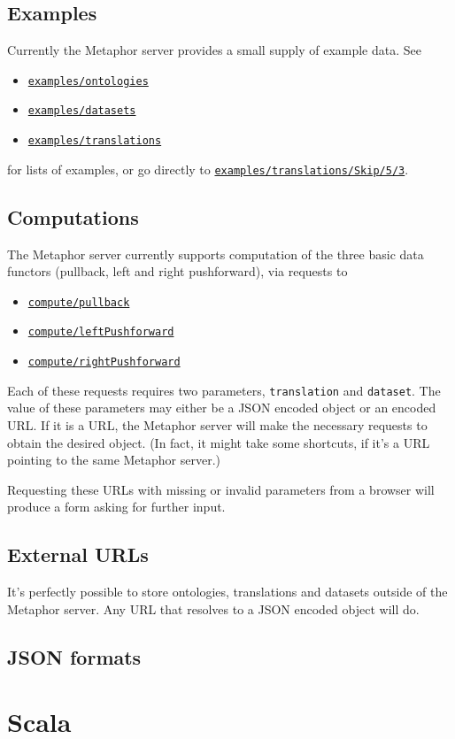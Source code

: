 \documentclass{amsart}
\newcommand{\code}[1]{{\tt #1}}
\newcommand{\metaphor}[1]{\href{http://categoricaldata.net/metaphor/#1}{\tt #1}}
\begin{document}
\subsection{Examples}
Currently the Metaphor server provides a small supply of example data. See
\begin{itemize}
\item \metaphor{examples/ontologies}
\item \metaphor{examples/datasets}
\item \metaphor{examples/translations}
\end{itemize}
for lists of examples, or go directly to \metaphor{examples/translations/Skip/5/3}.

\subsection{Computations}
The Metaphor server currently supports computation of the three basic data functors (pullback, left and right pushforward), via requests to
\begin{itemize}
\item \metaphor{compute/pullback}
\item \metaphor{compute/leftPushforward}
\item \metaphor{compute/rightPushforward}
\end{itemize}
Each of these requests requires two parameters, \code{translation} and \code{dataset}. The value of these parameters may either be a JSON encoded object or an encoded URL. If it is a URL, the Metaphor server will make the necessary requests to obtain the desired object. (In fact, it might take some shortcuts, if it's a URL pointing to the same Metaphor server.)

Requesting these URLs with missing or invalid parameters from a browser will produce a form asking for further input.

\subsection{External URLs}
It's perfectly possible to store ontologies, translations and datasets outside of the Metaphor server. Any URL that resolves to a JSON encoded object will do.

\subsection{JSON formats}
\label{sec:JSON}

\section{Scala}
\end{document}
